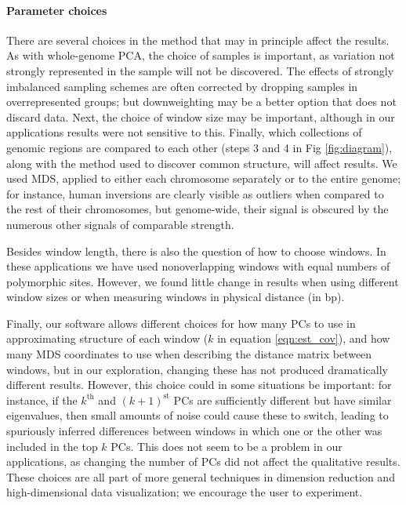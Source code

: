 \documentclass[11pt, oneside]{article}   	%
\newcommand\citep{\cite}
\newcommand{\Figure}{Fig }
\newcommand{\Figure}{{Figure }}
\renewcommand{\revpoint}[2]{\relax}
\begin{document}
\paragraph{Parameter choices}
There are several choices in the method that may in principle affect the results.
As with whole-genome PCA,
the choice of samples is important,
as variation not strongly represented in the sample will not be discovered.
The effects of strongly imbalanced sampling schemes are often corrected by dropping samples in overrepresented groups;
but downweighting may be a better option that does not discard data.
Next, the choice of window size may be important,
although in our applications results were not sensitive to this.
Finally, which collections of genomic regions are compared to each other (steps 3 and 4 in \Figure \ref{fig:diagram}),
along with the method used to discover common structure,
will affect results.
We used MDS, applied to either each chromosome separately or to the entire genome;
for instance, human inversions are clearly visible as outliers when compared to the rest of their chromosomes,
but genome-wide, their signal is obscured by the numerous other signals of comparable strength.

Besides window length, there is also the question of how to choose windows.
In these applications we have used nonoverlapping windows with equal numbers of polymorphic sites.
However, we found little change in results when using different window sizes
or when measuring windows in physical distance (in bp).


Finally, our software allows different choices for how many PCs to use in approximating structure of each window ($k$ in equation \ref{eqn:est_cov}),
and how many MDS coordinates to use when describing the distance matrix between windows,
but in our exploration, changing these has not produced dramatically different results.
However, this choice could in some situations be important:
for instance, if the $k^\text{th}$ and $(k+1)^\text{st}$ PCs 
are sufficiently different but have similar eigenvalues,
then small amounts of noise could cause these to switch,
leading to spuriously inferred differences between windows in which one or the other
was included in the top $k$ PCs.
This does not seem to be a problem in our applications,
as changing the number of PCs did not affect the qualitative results. \revpoint{2}{1}
These choices are all part of more general techniques in dimension reduction and high-dimensional data visualization;
we encourage the user to experiment.
\end{document}
